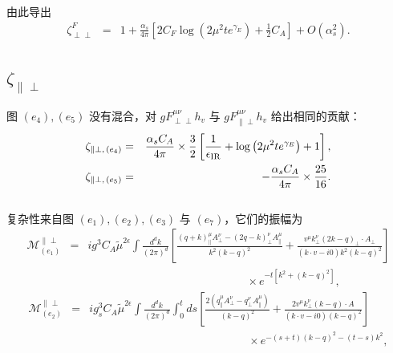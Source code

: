 由此导出
\begin{eqnarray}
\label{eq:resultgluonvertexF}
\zeta_{\perp\perp}^F&= &1+ \frac{\alpha_s}{4\pi} \left[2C_F\log\left(2\mu^2 te^{\gamma_E}\right)+\frac{1}{2}C_A\right] + O(\alpha_s^2).
\end{eqnarray}
\subsection{$\zeta_{\|\perp}$}
图 $(e_4), (e_5)$ 没有混合，对 $gF^{\mu\nu}_{\perp\perp}h_v$ 与 $gF^{\mu\nu}_{\|\perp}h_v$ 给出相同的贡献：
\begin{eqnarray}
\label{eq:e4pperpresult}
\zeta_{\|\perp,\, (e_4)}&=&\frac{\alpha_sC_A}{4\pi}\times \frac{3}{2} \left[\frac{1}{\epsilon_{\rm IR}}+\log\left(2\mu^2 te^{\gamma_E}\right) +1\right],\\
\label{eq:e5pperpresult}
\zeta_{\|\perp,\, (e_5)}
&=&- \frac{\alpha_sC_A}{4\pi}\times\frac{25}{16}.
\end{eqnarray}
\\
复杂性来自图 $(e_1), (e_2), (e_3)$ 与 $(e_7)$，它们的振幅为
\begin{eqnarray}
\label{eq:e1pperp}
\mathcal{M}_{(e_1)}^{\|\perp}
&=&ig^3C_A\tilde{\mu}^{2\epsilon}\int\frac{d^dk}{(2\pi)^d}\left[\frac{(q+k)^{\mu}_{\|} A_{\perp}^{\nu}-(2q-k)^{\nu}_{\perp} A^{\mu}_{\|}}{k^2(k-q)^2} +\frac{v^{\mu}k_{\perp}^{\nu}(2k-q)_{\perp}\cdot A_{\perp} }{(k\cdot v- i0)k^2(k-q)^2} \right]\nonumber\\
&&\, \, \, \, \, \, \, \, \, \, \, \, \, \, \, \, \, \, \, \, \, \, \, \, \, \, \, \, \, \, \, \, \, \, \, \, \, \, \, \, \, \, \, \, \, \, \, \, \, \, \, \, \, \, \, \, \,  \, \, \, \, \, \, \, \, \, \, \, \,  \, \, \, \, \, \, \, \, \, \, \, \,  \, \, \, \, \times e^{-t\left[k^2+(k-q)^2\right]},
\end{eqnarray}
\begin{eqnarray}
\label{eq:e2pperp}
\mathcal{M}_{(e_2)}^{\|\perp}
&=&ig_s^3C_A\tilde{\mu}^{2\epsilon}\int\frac{d^dk}{(2\pi)^d}\int_0^t ds \left[\frac{2\left(q^{\mu}_{\|}A^{\nu}_{\perp} - q_{\perp}^{\nu}A_{\|}^{\mu}\right)}{(k-q)^2} +\frac{2v^{\mu}k_{\perp}^{\nu}(k-q)\cdot A}{(k\cdot v-i0)(k-q)^2}\right]\nonumber\\
&&\, \, \, \, \, \, \, \, \, \, \, \, \, \, \, \, \, \, \, \, \, \, \, \, \, \, \, \, \, \, \, \, \, \, \, \, \, \, \, \, \, \, \, \, \, \, \, \, \, \, \, \, \, \, \, \, \, \, \,  \, \, \, \, \, \, \, \, \, \, \,  \, \, \, \, \, \, \, \, \, \, \,  \, \, \, \, \times e^{-(s+t)(k-q)^2-(t-s)k^2},
\end{eqnarray}
